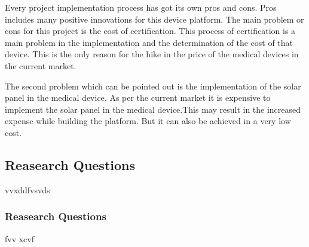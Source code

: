 Every project implementation process has got its own pros and cons. Pros includes many positive innovations for this device platform. The main problem or cons for this project is the cost of certification. This process of certification is a main problem in the implementation and the determination of the cost of that device. This is the only reason for the hike in the price of the medical devices in the current market.

The second problem which can be pointed out is the implementation of the solar panel in the medical device. As per the current market it  is expensive to implement the solar panel in the medical device.This may result in the increased expense while building the platform. But it can also be achieved in a very low cost.



\subsection{Reasearch Questions}

vvxddfvsvds

\subsubsection{Reasearch Questions}
fvv xcvf